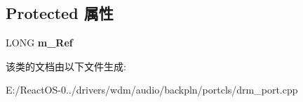 \subsection*{Protected 属性}
\begin{DoxyCompactItemize}
\item 
\mbox{\label{class_c_drm_port2_a1f38ede9b0acac651abbeb9b0a3b4993}} 
L\+O\+NG {\bfseries m\+\_\+\+Ref}
\end{DoxyCompactItemize}


该类的文档由以下文件生成\+:\begin{DoxyCompactItemize}
\item 
E\+:/\+React\+O\+S-\/0../drivers/wdm/audio/backpln/portcls/drm\+\_\+port.\+cpp\end{DoxyCompactItemize}
